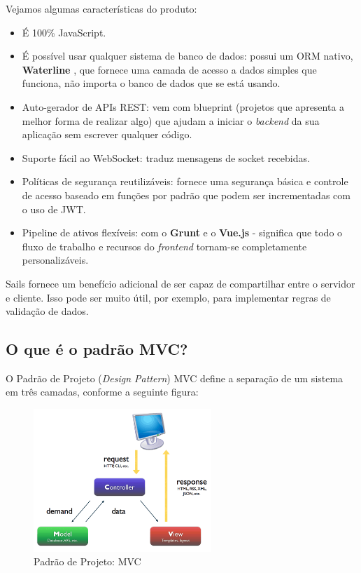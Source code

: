 \documentclass[a4paper,11pt]{article}
\begin{document}
Vejamos algumas características do produto: \vspace{-1em}
\begin{itemize}
  \item É 100\% JavaScript.
  \item É possível usar qualquer sistema de banco de dados: possui um ORM nativo, \textbf{Waterline} \cite{waterline}, que fornece uma camada de acesso a dados simples que funciona, não importa o banco de dados que se está usando.
  \item Auto-gerador de APIs REST: vem com blueprint (projetos que apresenta a melhor forma de realizar algo) que ajudam a iniciar o \textit{backend} da sua aplicação sem escrever qualquer código.
  \item Suporte fácil ao WebSocket: traduz mensagens de socket recebidas.
  \item Políticas de segurança reutilizáveis: fornece uma segurança básica e controle de acesso baseado em funções por padrão que podem ser incrementadas com o uso de JWT.
  \item Pipeline de ativos flexíveis: com o \textbf{Grunt} e o \textbf{Vue.js} - significa que todo o fluxo de trabalho e recursos do \textit{frontend} tornam-se completamente personalizáveis.
\end{itemize}

Sails fornece um benefício adicional de ser capaz de compartilhar entre o servidor e cliente. Isso pode ser muito útil, por exemplo, para implementar regras de validação de dados.

\subsection{O que é o padrão MVC?}
O Padrão de Projeto (\textit{Design Pattern}) MVC define a separação de um sistema em três camadas, conforme a seguinte figura:
\begin{figure}[H]
	\centering
	\includegraphics[width=0.6\textwidth]{imagens/mvc.png}
	\caption{Padrão de Projeto: MVC}
\end{figure}
\end{document}
